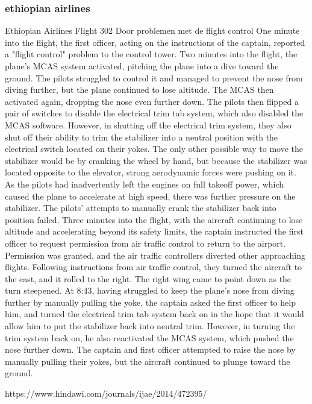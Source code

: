 \subsubsection{ethiopian airlines}
Ethiopian Airlines Flight 302
Door problemen met de flight control
One minute into the flight, the first officer, acting on the instructions of the captain, reported a "flight control" problem to the control tower.
Two minutes into the flight, the plane's MCAS system activated, pitching the plane into a dive toward the ground. The pilots struggled to control it and managed to prevent the nose from diving further, but the plane continued to lose altitude.
The MCAS then activated again, dropping the nose even further down. The pilots then flipped a pair of switches to disable the electrical trim tab system, which also disabled the MCAS software. However, in shutting off the electrical trim system, they also shut off their ability to trim the stabilizer into a neutral position with the electrical switch located on their yokes. The only other possible way to move the stabilizer would be by cranking the wheel by hand, but because the stabilizer was located opposite to the elevator, strong aerodynamic forces were pushing on it.
As the pilots had inadvertently left the engines on full takeoff power, which caused the plane to accelerate at high speed, there was further pressure on the stabilizer. The pilots' attempts to manually crank the stabilizer back into position failed.
Three minutes into the flight, with the aircraft continuing to lose altitude and accelerating beyond its safety limits, the captain instructed the first officer to request permission from air traffic control to return to the airport. Permission was granted, and the air traffic controllers diverted other approaching flights. Following instructions from air traffic control, they turned the aircraft to the east, and it rolled to the right. The right wing came to point down as the turn steepened.
At 8:43, having struggled to keep the plane's nose from diving further by manually pulling the yoke, the captain asked the first officer to help him, and turned the electrical trim tab system back on in the hope that it would allow him to put the stabilizer back into neutral trim. However, in turning the trim system back on, he also reactivated the MCAS system, which pushed the nose further down. The captain and first officer attempted to raise the nose by manually pulling their yokes, but the aircraft continued to plunge toward the ground.

https://www.hindawi.com/journals/ijae/2014/472395/ 


